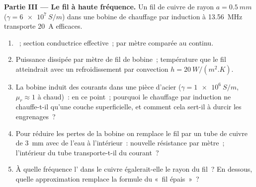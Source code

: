 \begin{problem}
\medskip
\noindent\textbf{Partie III --- Le fil à haute fréquence.}
Un fil de cuivre de rayon $a = \qty{0.5}{mm}$ ($\gamma = \qty{6e7}{S/m}$) dans une
bobine de chauffage par induction à \qty{13.56}{MHz} transporte \qty{20}{A} efficaces.
\begin{enumerate}[resume]
  \item {}~; section conductrice effective~;  par
        mètre comparée au continu.
  \item Puissance dissipée par mètre de fil de bobine~; température que
        le fil atteindrait avec un refroidissement par convection $h = \qty{20}{W/(m^2.K)}$.
  \item La bobine induit des courants dans une pièce d'acier ($\gamma =
        \qty{1e6}{S/m}$, $\mu_r \approx 1$ à chaud)~:  en ce point~; pourquoi le
        chauffage par induction ne chauffe-t-il qu'une couche superficielle, et comment cela
        sert-il à durcir les engrenages~?
  \item Pour réduire les pertes de la bobine on remplace le fil par un tube
        de cuivre de \qty{3}{mm} avec de l'eau à l'intérieur~: nouvelle résistance par mètre~;
        l'intérieur du tube transporte-t-il du courant~?
  \item À quelle fréquence l' dans le cuivre égalerait-elle le
        rayon du fil~? En dessous, quelle approximation remplace la
        formule du «~fil épais~»~?
\end{enumerate}


\end{problem}
